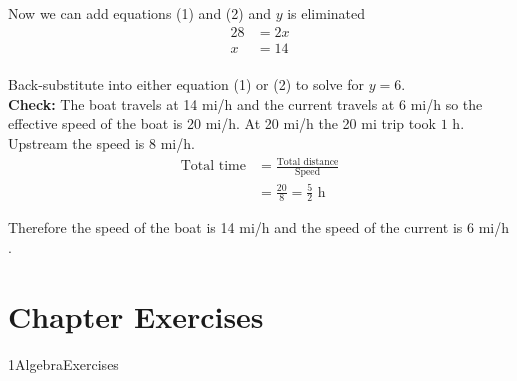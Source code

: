  Now we can add equations (1) and (2) and $y$ is eliminated
 \begin{align*}28 &  =  2 x \\
 x &  =  14\end{align*} \\
 Back-substitute into either equation (1) or (2) to solve for $y =  6$.\medskip\\
 \textbf{Check:} The boat travels at 14 $\mbox{mi}$/$\mbox{h}$ and the current travels at 6 $\mbox{mi}$/$\mbox{h}$ so the effective speed of the boat is 20 $\mbox{mi}$/$\mbox{h}$. At 20 $\mbox{mi}$/$\mbox{h}$ the 20 $\mbox{mi}$ trip took $1$ $\mbox{h}$. Upstream the speed is 8 $\mbox{mi}$/$\mbox{h}$.
 \begin{align*}\text{Total time} &  =  \frac{\text{Total distance}}{\text{Speed}} \\
 &  =  \frac{20}{8} =\frac{5}{2} \text{ h}\end{align*}

 Therefore the speed of the boat is 14 $\mbox{mi}$/$\mbox{h}$ and the speed of the current is 6 $\mbox{mi}$/$\mbox{h}$.
 \clearpage
\section{Chapter Exercises}
{1AlgebraExercises}
